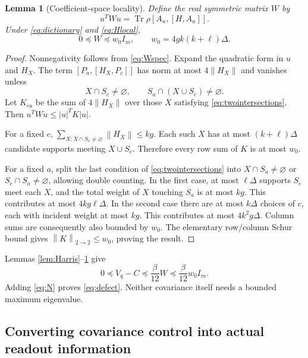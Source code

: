 \documentclass[11pt,a4paper]{article}
\newtheorem{lemma}[theorem]{Lemma}
\theoremstyle{remark}
\newcommand{\Tr}{\operatorname{Tr}}
\newcommand{\norm}[1]{\left\lVert #1\right\rVert}
\begin{document}
\begin{lemma}[Coefficient-space locality]\label{lem:W}
Define the real symmetric matrix $W$ by
\[
 u^TWu=\Tr\rho[A_u,[H,A_u]].
\]
Under \eqref{eq:dictionary} and \eqref{eq:Hlocal},
\begin{equation}
 0\preceq W\preceq w_0I_m,
 \qquad w_0=4gk(k+\ell)\Delta.
 \label{eq:W}
\end{equation}
\end{lemma}
\begin{proof}
Nonnegativity follows from \eqref{eq:Wspec}. Expand the quadratic form in $u$ and $H_X$. The term $[P_a,[H_X,P_c]]$ has norm at most $4\norm{H_X}$ and vanishes unless
\begin{equation}
 X\cap S_c\ne\varnothing,
 \qquad S_a\cap(X\cup S_c)\ne\varnothing.
 \label{eq:twointersections}
\end{equation}
Let $K_{ca}$ be the sum of $4\norm{H_X}$ over those $X$ satisfying \eqref{eq:twointersections}. Then $u^TWu\le |u|^TK|u|$.

For a fixed $c$, $\sum_{X:X\cap S_c\ne\varnothing}\norm{H_X}\le kg$. Each such $X$ has at most $(k+\ell)\Delta$ candidate supports meeting $X\cup S_c$. Therefore every row sum of $K$ is at most $w_0$.

For a fixed $a$, split the last condition of \eqref{eq:twointersections} into $X\cap S_a\ne\varnothing$ or $S_c\cap S_a\ne\varnothing$, allowing double counting. In the first case, at most $\ell\Delta$ supports $S_c$ meet each $X$, and the total weight of $X$ touching $S_a$ is at most $kg$. This contributes at most $4kg\ell\Delta$. In the second case there are at most $k\Delta$ choices of $c$, each with incident weight at most $kg$. This contributes at most $4k^2g\Delta$. Column sums are consequently also bounded by $w_0$. The elementary row/column Schur bound gives $\norm{K}_{2\to2}\le w_0$, proving the result.
\end{proof}

Lemmas \ref{lem:Harris}--\ref{lem:W} give
\begin{equation}
 0\preceq V_q-C\preceq \frac\beta{12}W
 \preceq\frac\beta{12}w_0I_m.
 \label{eq:D}
\end{equation}
Adding \eqref{eq:N} proves \eqref{eq:defect}. Neither covariance itself needs a bounded maximum eigenvalue.

\subsection{Converting covariance control into actual readout information}
\end{document}
